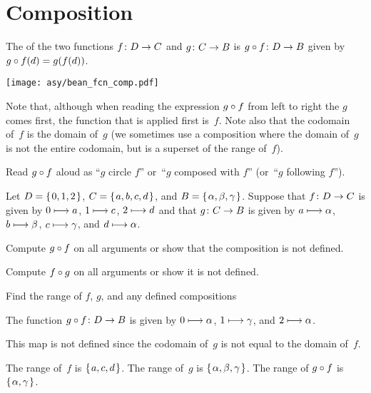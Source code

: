 \documentclass{ibl}  %
\begin{document}
\section{Composition}

\begin{df}
The  of
the two functions
$\mbox{$f\colon D\to C$}$ and $\mbox{$g\colon C\to B$}$ 
is $\mbox{$g\mathbin{\circ} f\colon D\to B$}$ given by 
$g\mathbin{\circ} f(d)=g(f(d))$.
\end{df}

\begin{center}
  \texttt{[image: asy/bean\_fcn\_comp.pdf]}  
\end{center}

Note that, 
although when reading the expression $g\mathbin{\circ} f$ from left to right 
the $g$ comes first, 
the function that is applied first is~$f$. 
Note also that the codomain of~$f$ is the domain of~$g$
(we sometimes use a composition where the domain of~$g$ is not the 
entire codomain, but is a superset of the range of~$f$).

Read $g\mathbin{\circ} f$ aloud as ``$g$ circle $f$'' 
or~``$g$ composed with $f$''
(or~``$g$ following $f$'').

\begin{ex} Let $D=\mbox{$\{\hspace{0.1em}0,1,2\hspace{0.1em}\}$}$, $C=\mbox{$\{\hspace{0.1em}a,b,c,d\hspace{0.1em}\}$}$, 
and $B=\mbox{$\{\hspace{0.1em}\alpha,\beta,\gamma\hspace{0.1em}\}$}$.
Suppose that $\mbox{$f\colon D\to C$}$ is given by $0\stackrel{}{\longmapsto} a$, $1\stackrel{}{\longmapsto} c$, 
$2\stackrel{}{\longmapsto} d$ and that $\mbox{$g\colon C\to B$}$
is given by 
$a\stackrel{}{\longmapsto}\alpha$, $b\stackrel{}{\longmapsto} \beta$, $c\stackrel{}{\longmapsto}\gamma$,
and $d\stackrel{}{\longmapsto}\alpha$.
\begin{items}
\item Compute $g\mathbin{\circ} f$ on all arguments or show that the composition
  is not defined.
\item Compute $f\mathbin{\circ} g$ on all arguments or show it is not defined.
\item Find the range of $f$, $g$, and any defined compositions    
\end{items}
\begin{ans}
\begin{items}
\item The function $\mbox{$g\mathbin{\circ} f\colon D\to B$}$ is given by 
  $0\stackrel{}{\longmapsto}\alpha$, $1\stackrel{}{\longmapsto}\gamma$, and $2\stackrel{}{\longmapsto}\alpha$.
\item This map is not defined since the codomain of~$g$ is not equal to 
  the domain of~$f$.
\item The range of~$f$ is $\mbox{$\{\hspace{0.1em}a,c,d\hspace{0.1em}\}$}$.
  The range of~$g$ is $\mbox{$\{\hspace{0.1em}\alpha,\beta,\gamma\hspace{0.1em}\}$}$. 
  The range of $g\mathbin{\circ} f$ is $\mbox{$\{\hspace{0.1em}\alpha,\gamma\hspace{0.1em}\}$}$.
\end{items}
\end{ans}
\end{ex}
\end{document}
